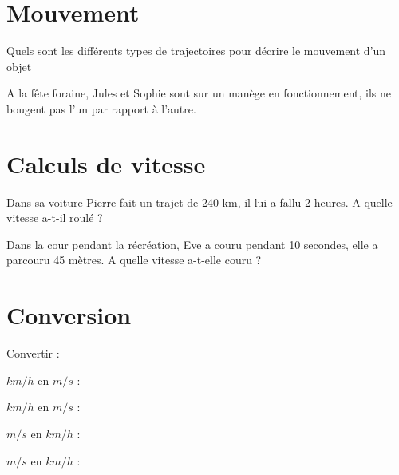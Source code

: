 


\section{Mouvement}

\begin{questions}
	\question Quels sont les différents types de trajectoires pour décrire le mouvement d'un objet
	\fillwithdottedlines{2cm}
	
	\question A la fête foraine, Jules et Sophie sont sur un manège en fonctionnement, ils ne bougent pas l'un par rapport à l'autre.
	
	
\end{questions}



\section{Calculs de vitesse}

\begin{questions}
	
	\question Dans sa voiture Pierre fait un trajet de 240 km, il lui a fallu 2 heures. A quelle vitesse a-t-il roulé ?
	\fillwithdottedlines{3cm}
	
	\question Dans la cour pendant la récréation, Eve a couru pendant 10 secondes, elle a parcouru 45 mètres. A quelle vitesse a-t-elle couru ?
	\fillwithdottedlines{3cm}
	
\end{questions}

\newpage

\section{Conversion}

Convertir :
\begin{questions}
	
	 $km/h$ en $m/s$ :
	\fillwithdottedlines{2cm}
	
	 $km/h$ en $m/s$ :
	\fillwithdottedlines{2cm}
	
	 $m/s$ en $km/h$ :
	\fillwithdottedlines{2cm}
	
	 $m/s$ en $km/h$ :
	\fillwithdottedlines{2cm}
		
\end{questions}